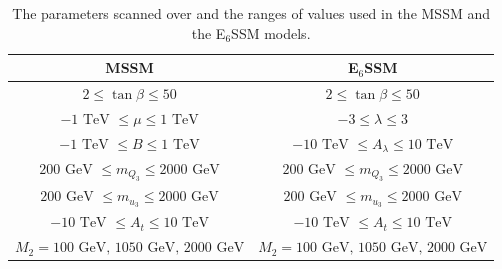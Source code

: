 \documentclass[preprint,amsmath,amssymb,aps,superscriptaddress,prd,
showpacs,floatfix,nofootinbib]{revtex4-1}
\begin{document}
\begin{table}[h]
\centering
\begin{ruledtabular}
\begin{tabular}{cc}
MSSM & E$_6$SSM \\
\hline
$2 \leq \tan\beta \leq 50$ & $2 \leq \tan\beta \leq 50$ \\
$-1 \textrm{ TeV } \leq \mu \leq 1 \textrm{ TeV}$ & $-3 \leq \lambda \leq 3$\\
$-1 \textrm{ TeV } \leq B \leq 1 \textrm{ TeV}$ & $-10 \textrm{ TeV } \leq
A_\lambda \leq 10 \textrm{ TeV}$ \\
$ 200 \textrm{ GeV } \leq m_{Q_3} \leq 2000 \textrm { GeV}$ & $200
\textrm{ GeV } \leq m_{Q_3} \leq 2000 \textrm { GeV}$ \\
$200 \textrm{ GeV } \leq m_{u_3} \leq 2000 \textrm { GeV}$ & $200
\textrm{ GeV } \leq m_{u_3} \leq 2000 \textrm { GeV}$ \\
$-10 \textrm{ TeV } \leq A_t \leq 10 \textrm { TeV}$ & $-10
\textrm{ TeV } \leq A_t \leq 10 \textrm { TeV}$ \\
$M_2 = 100 \textrm{ GeV, } 1050 \textrm{ GeV, } 2000 \textrm{ GeV}$ &
$M_2 = 100 \textrm{ GeV, } 1050 \textrm{ GeV, } 2000 \textrm{ GeV}$ \\
\end{tabular}
\end{ruledtabular}
\caption{The parameters scanned over and the ranges of values used in
the MSSM and the E$_6$SSM models.}
\label{tab:scanranges}
\end{table}
\end{document}
